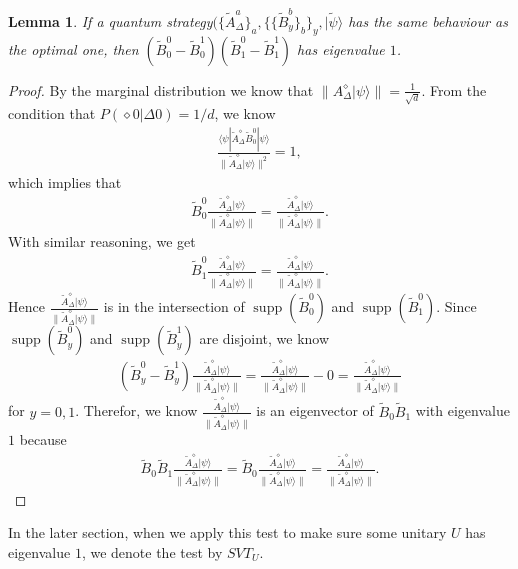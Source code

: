 \documentclass[11pt,letterpaper]{article}
\newcommand{\ket}[1]{|#1\rangle}
\newcommand{\bra}[1]{\langle#1|}
\DeclareMathOperator{\supp}{supp}
\newcommand{\1}{\mathbb{1}}
\newcommand{\SVT}{SVT}
\newcommand{\tA}{\tilde{A}}
\newcommand{\tB}{\tilde{B}}
\newcommand{\tpsi}{\tilde{\psi}}
\newcommand{\tri}{\Delta}
\newtheorem{lemma}[theorem]{Lemma}
\theoremstyle{definition}
\begin{document}
\begin{lemma}
	\label{lm:svt_comp}
	If a quantum strategy$(\{\tA_\tri^a\}_a, \{\{\tB_y^b\}_b\}_y, \ket{\tpsi}$ has the same behaviour as
	the optimal one, then $(\tB_0^0 - \tB_0^1)(\tB_1^0-\tB_1^1)$ has eigenvalue $1$.
\end{lemma}
\begin{proof}
By the marginal distribution we know that $\| A_\tri^\diamond \ket{\psi}\| = \frac{1}{\sqrt{d}}$.
From the condition that $P(\diamond 0|\tri 0) = 1/d$, we know
\begin{align}
	\frac{  \bra{\psi} \tA_\tri^\diamond  \tB_0^0 \ket{\psi}}{\| \tA_\tri^\diamond \ket{\psi}\|^2} = 1,
\end{align}
which implies that 
\begin{align}
 \tB_0^0 \frac{\tA_\tri^\diamond \ket{\psi}}{\| \tA_\tri^\diamond \ket{\psi}\|} = \frac{\tA_\tri^\diamond \ket{\psi}}{\| \tA_\tri^\diamond \ket{\psi}\|}.
\end{align}
With similar reasoning, we get
\begin{align}
 \tB_1^0 \frac{\tA_\tri^\diamond \ket{\psi}}{\| \tA_\tri^\diamond \ket{\psi}\|} = \frac{\tA_\tri^\diamond \ket{\psi}}{\| \tA_\tri^\diamond \ket{\psi}\|}.
\end{align}
Hence $ \frac{\tA_\tri^\diamond \ket{\psi}}{\| \tA_\tri^\diamond \ket{\psi}\|} $ is in the intersection of $\supp(\tB_0^0)$ and $\supp(\tB_1^0)$.
Since $\supp(\tB_y^0)$ and $\supp(\tB_y^1)$ are disjoint, we know
\begin{align*}
	(\tB_y^0 - \tB_y^1)  \frac{\tA_\tri^\diamond \ket{\psi}}{\| \tA_\tri^\diamond \ket{\psi}\|}  =  \frac{\tA_\tri^\diamond \ket{\psi}}{\| \tA_\tri^\diamond \ket{\psi}\|} - 0 = \frac{\tA_\tri^\diamond \ket{\psi}}{\| \tA_\tri^\diamond \ket{\psi}\|} 
\end{align*}
for $y = 0,1$.
Therefor, we know $ \frac{\tA_\tri^\diamond \ket{\psi}}{\| \tA_\tri^\diamond \ket{\psi}\|} $ is an eigenvector of $\tB_0\tB_1$ with eigenvalue $1$ because
\begin{align}
	\tB_0\tB_1 \frac{\tA_\tri^\diamond \ket{\psi}}{\| \tA_\tri^\diamond \ket{\psi}\|} = \tB_0 \frac{\tA_\tri^\diamond \ket{\psi}}{\| \tA_\tri^\diamond \ket{\psi}\|} =  \frac{\tA_\tri^\diamond \ket{\psi}}{\| \tA_\tri^\diamond \ket{\psi}\|}.
\end{align}
\end{proof}
In the later section, when we apply this test to make sure some unitary $U$ has eigenvalue $1$, 
we denote the test by $\SVT_U$.
\end{document}
